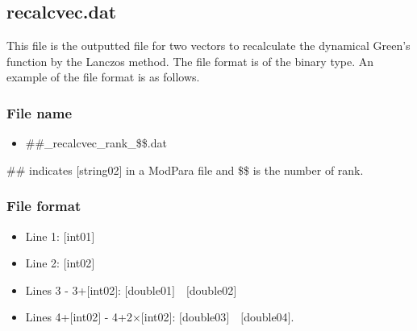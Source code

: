 \newpage
\subsection{{recalcvec.dat}}
This file is the outputted file for two vectors to recalculate the dynamical Green's function by the Lanczos method. 
The file format is of the binary type.  An example of the file format is as follows.

\subsubsection{File name}
\begin{itemize}
   \item{\#\#\_recalcvec\_rank\_\$\$.dat}
\end{itemize}
\#\# indicates [string02] in a ModPara file and \$\$ is the number of rank. 

\subsubsection{File format}
 \begin{itemize}
   \item  Line 1: $[$int01$]$
   \item  Line 2: $[$int02$]$
   \item  Lines 3 - 3+$[$int02$]$: $[$double01$]$~~$[$double02$]$
   \item  Lines 4+$[$int02$]$ - 4+2$\times [$int02$]$: $[$double03$]$~~$[$double04$]$.

  \end{itemize}
